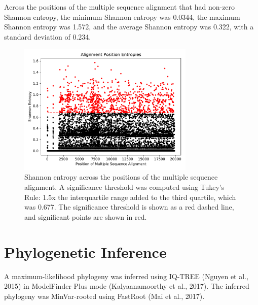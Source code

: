 \documentclass{article}
\begin{document}
 Across the positions of the multiple sequence alignment that had non-zero Shannon entropy, the minimum Shannon entropy was 0.0344, the maximum Shannon entropy was 1.572, and the average Shannon entropy was 0.322, with a standard deviation of 0.234.

\begin{figure}[h]
\centering
\includegraphics[width=0.75\textwidth,keepaspectratio]{./figs/alignment_entropies.pdf}
\caption{Shannon entropy across the positions of the multiple sequence alignment. A significance threshold was computed using Tukey's Rule: 1.5x the interquartile range added to the third quartile, which was 0.677. The significance threshold is shown as a red dashed line, and significant points are shown in red.}
\end{figure}

\section{Phylogenetic Inference}
A maximum-likelihood phylogeny was inferred using IQ-TREE (Nguyen et al., 2015) in ModelFinder Plus mode (Kalyaanamoorthy et al., 2017). The inferred phylogeny was MinVar-rooted using FastRoot (Mai et al., 2017).
\end{document}
